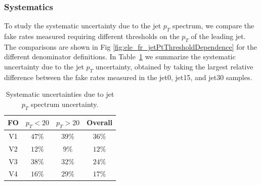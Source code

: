 \subsubsection{Systematics}
To study the systematic uncertainty due to the jet $p_{T}$ spectrum, we compare the fake rates
measured requiring different thresholds on the $p_{T}$ of the leading jet. The comparisons
are shown in Fig \ref{fig:ele_fr_jetPtThresholdDependence} for the different denominator definitions. 
In Table~\ref{tab:ele_fr_ptThreshold_dep} we summarize the systematic uncertainty due to 
the jet $p_{T}$ uncertainty, obtained by taking the largest relative difference between 
the fake rates measured in the jet0, jet15, and jet30 samples.

\begin{table}[!htbp]
\begin{center}
\begin{tabular}{|c|cc|c|}
\hline
FO & $p_T<20$ & $p_T>20$ & Overall \\
\hline 
V1 & $47\%$ & $39\%$ & $36\%$ \\
V2 & $12\%$ & $9\%$ & $12\%$ \\
V3 & $38\%$ & $32\%$ & $24\%$ \\
V4 & $16\%$ & $29\%$ & $17\%$ \\
\hline
\end{tabular}
\caption{Systematic uncertainties due to jet $p_{T}$ spectrum uncertainty.}
\label{tab:ele_fr_ptThreshold_dep}
\end{center}
\end{table}


